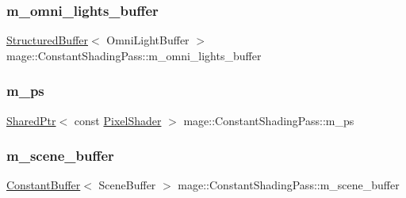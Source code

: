 \subsubsection{\texorpdfstring{m\+\_\+omni\+\_\+lights\+\_\+buffer}{m\_omni\_lights\_buffer}}
{\footnotesize\ttfamily \hyperlink{structmage_1_1_structured_buffer}{Structured\+Buffer}$<$ Omni\+Light\+Buffer $>$ mage\+::\+Constant\+Shading\+Pass\+::m\+\_\+omni\+\_\+lights\+\_\+buffer\hspace{0.3cm}{\ttfamily [private]}}

\hypertarget{classmage_1_1_constant_shading_pass_aa7768c70069825ef231bcaa1cba15263}{}\label{classmage_1_1_constant_shading_pass_aa7768c70069825ef231bcaa1cba15263} 
\subsubsection{\texorpdfstring{m\+\_\+ps}{m\_ps}}
{\footnotesize\ttfamily \hyperlink{namespacemage_a1e01ae66713838a7a67d30e44c67703e}{Shared\+Ptr}$<$ const \hyperlink{namespacemage_ac98506b7edd999ea43ec46fbd0330238}{Pixel\+Shader} $>$ mage\+::\+Constant\+Shading\+Pass\+::m\+\_\+ps\hspace{0.3cm}{\ttfamily [private]}}

\hypertarget{classmage_1_1_constant_shading_pass_a90b8b9d41ed31cf1a60d5e8949fee781}{}\label{classmage_1_1_constant_shading_pass_a90b8b9d41ed31cf1a60d5e8949fee781} 
\subsubsection{\texorpdfstring{m\+\_\+scene\+\_\+buffer}{m\_scene\_buffer}}
{\footnotesize\ttfamily \hyperlink{structmage_1_1_constant_buffer}{Constant\+Buffer}$<$ Scene\+Buffer $>$ mage\+::\+Constant\+Shading\+Pass\+::m\+\_\+scene\+\_\+buffer\hspace{0.3cm}{\ttfamily [private]}}

\hypertarget{classmage_1_1_constant_shading_pass_ac65e692c0503240ce29aabd0f7a29b9d}{}\label{classmage_1_1_constant_shading_pass_ac65e692c0503240ce29aabd0f7a29b9d} 
